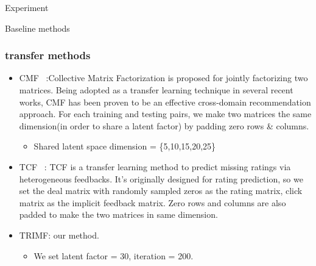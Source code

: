 \begin{section}{Experiment}
\begin{subsection}{Baseline methods}
{\subsubsection{transfer methods}
\begin{itemize}
    \item CMF ~\cite{/kdd/SinghG08}:Collective Matrix Factorization is proposed for jointly factorizing two matrices. Being adopted as a transfer
learning technique in several recent works, CMF has been proven to be an effective cross-domain recommendation approach. For each training and testing pairs, we make two matrices the same dimension(in order to share a latent factor) by padding zero rows \& columns.
      \begin{itemize}
      \item Shared latent space dimension = \{5,10,15,20,25\}
      \end{itemize}
    \item TCF ~\cite{/ijcai/PanLXY11}: TCF is a transfer learning method to predict missing ratings via heterogeneous feedbacks. It's originally designed for rating prediction, so we set the deal matrix with randomly sampled zeros as the rating matrix, click matrix as the implicit feedback matrix. Zero rows and columns are also padded to make the two matrices in same dimension.
\item TRIMF: our method.
  \begin{itemize}
  \item We set latent factor = 30, iteration = 200.
  \end{itemize}
    \end{itemize}
  
}
\end{subsection}
\end{section}
